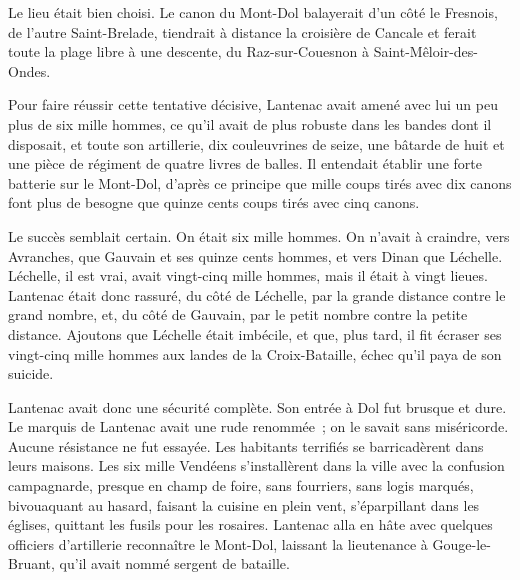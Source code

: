 \documentclass[french,twoside]{book} %
\begin{document}
Le lieu était bien choisi. Le canon du Mont-Dol balayerait d’un côté le Fresnois, de l’autre Saint-Brelade, tiendrait à distance la croisière de Cancale et ferait toute la plage libre à une descente, du Raz-sur-Couesnon à Saint-Mêloir-des-Ondes.\par
Pour faire réussir cette tentative décisive, Lantenac avait amené avec lui un peu plus de six mille hommes, ce qu’il avait de plus robuste dans les bandes dont il disposait, et toute son artillerie, dix couleuvrines de seize, une bâtarde de huit et une pièce de régiment de quatre livres de balles. Il entendait établir une forte batterie sur le Mont-Dol, d’après ce principe que mille coups tirés avec dix canons font plus de besogne que quinze cents coups tirés avec cinq canons.\par
Le succès semblait certain. On était six mille hommes. On n’avait à craindre, vers Avranches, que Gauvain et ses quinze cents hommes, et vers Dinan  que Léchelle. Léchelle, il est vrai, avait vingt-cinq mille hommes, mais il était à vingt lieues. Lantenac était donc rassuré, du côté de Léchelle, par la grande distance contre le grand nombre, et, du côté de Gauvain, par le petit nombre contre la petite distance. Ajoutons que Léchelle était imbécile, et que, plus tard, il fit écraser ses vingt-cinq mille hommes aux landes de la Croix-Bataille, échec qu’il paya de son suicide.\par
Lantenac avait donc une sécurité complète. Son entrée à Dol fut brusque et dure. Le marquis de Lantenac avait une rude renommée ; on le savait sans miséricorde. Aucune résistance ne fut essayée. Les habitants terrifiés se barricadèrent dans leurs maisons. Les six mille Vendéens s’installèrent dans la ville avec la confusion campagnarde, presque en champ de foire, sans fourriers, sans logis marqués, bivouaquant au hasard, faisant la cuisine en plein vent, s’éparpillant dans les églises, quittant les fusils pour les rosaires. Lantenac alla en hâte avec quelques officiers d’artillerie reconnaître le Mont-Dol, laissant la lieutenance à Gouge-le-Bruant, qu’il avait nommé sergent de bataille.\par
\end{document}
